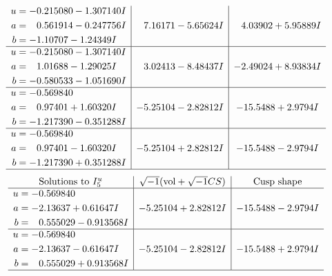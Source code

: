 \documentclass[1p]{elsarticle_modified}
\theoremstyle{definition}
\newcommand{\I}{\sqrt{-1}}
\begin{document}
$$\begin{array}{c|c|c}
\begin{aligned}
u &= -0.215080 - 1.307140 I \\
a &= \phantom{-}0.561914 - 0.247756 I \\
b &= -1.10707 - 1.24349 I\end{aligned}
 & \phantom{-}7.16171 - 5.65624 I & \phantom{-}4.03902 + 5.95889 I \\ \hline\begin{aligned}
u &= -0.215080 - 1.307140 I \\
a &= \phantom{-}1.01688 - 1.29025 I \\
b &= -0.580533 - 1.051690 I\end{aligned}
 & \phantom{-}3.02413 - 8.48437 I & -2.49024 + 8.93834 I \\ \hline\begin{aligned}
u &= -0.569840\phantom{ +0.000000I} \\
a &= \phantom{-}0.97401 + 1.60320 I \\
b &= -1.217390 - 0.351288 I\end{aligned}
 & -5.25104 - 2.82812 I & -15.5488 + 2.9794 I \\ \hline\begin{aligned}
u &= -0.569840\phantom{ +0.000000I} \\
a &= \phantom{-}0.97401 - 1.60320 I \\
b &= -1.217390 + 0.351288 I\end{aligned}
 & -5.25104 + 2.82812 I & -15.5488 - 2.9794 I\\
 \hline 
 \end{array}$$\newpage$$\begin{array}{c|c|c}  
\text{Solutions to }I^u_{5}& \I (\text{vol} + \sqrt{-1}CS) & \text{Cusp shape}\\
 \hline 
\begin{aligned}
u &= -0.569840\phantom{ +0.000000I} \\
a &= -2.13637 + 0.61647 I \\
b &= \phantom{-}0.555029 - 0.913568 I\end{aligned}
 & -5.25104 + 2.82812 I & -15.5488 - 2.9794 I \\ \hline\begin{aligned}
u &= -0.569840\phantom{ +0.000000I} \\
a &= -2.13637 - 0.61647 I \\
b &= \phantom{-}0.555029 + 0.913568 I\end{aligned}
 & -5.25104 - 2.82812 I & -15.5488 + 2.9794 I\\
 \hline 
 \end{array}$$\newpage\newpage\renewcommand{\arraystretch}{1}
\end{document}
